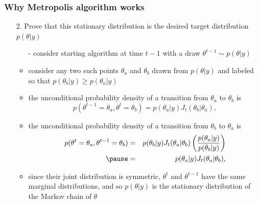 \documentclass[10pt,handout]{beamer}
\begin{document}
\begin{frame}

\frametitle{ Why Metropolis algorithm works}

  \begin{itemize}
  \item[2.] Prove that this stationary distribution is the desired target distribution $p(\theta|y)$
    \begin{itemize}
    \item[-] consider starting algorithm at time $t-1$ with a draw
      $\theta^{t-1} \sim p(\theta|y)$
    \item<2->[-] consider any two such points $\theta_a$ and $\theta_b$ drawn
      from $p(\theta|y)$ and labeled so that
      $p(\theta_b|y)\geq p(\theta_a|y)$
    \item<3->[-] the unconditional probability density of a transition from $\theta_a$ to $\theta_b$ is
      \vspace{-0.5\baselineskip}
      \begin{equation*}
        p(\theta^{t-1}=\theta_a,\theta^{t}=\theta_b)=
        p(\theta_a|y)J_t(\theta_b|\theta_a),
      \end{equation*}
      \vspace{-1\baselineskip}
    \item<4->[-] the unconditional probability density of a transition from $\theta_b$ to $\theta_a$ is
      \vspace{-0.5\baselineskip}
      \begin{eqnarray*}
        p(\theta^{t}=\theta_a,\theta^{t-1}=\theta_b) & = &
        p(\theta_b|y)J_t(\theta_a|\theta_b)\left(\frac{p(\theta_a|y)}{p(\theta_b|y)}\right)\\
        \pause &  = &  p(\theta_a|y)J_t(\theta_a|\theta_b),
      \end{eqnarray*}
      \pause
    \item<6->[-] since their joint distribution is symmetric, $\theta^t$ and
      $\theta^{t-1}$ have the same marginal distributions, and so
      $p(\theta|y)$ is the stationary distribution of the Markov chain of $\theta$
    \end{itemize}
  \end{itemize}

\end{frame}
\end{document}
